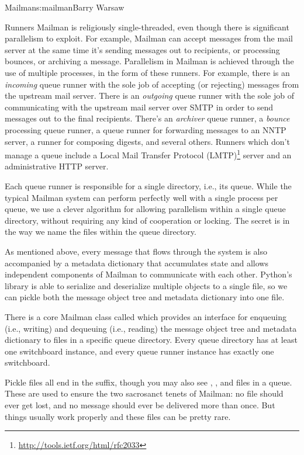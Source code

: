 \begin{aosachapter}{Mailman}{s:mailman}{Barry Warsaw}
\begin{aosasect1}{Runners}
Mailman is religiously single-threaded, even though there is
significant parallelism to exploit.  For example, Mailman can accept
messages from the mail server at the same time it's sending messages
out to recipients, or processing bounces, or archiving a message.
Parallelism in Mailman is achieved through the use of multiple
processes, in the form of these runners.  For example, there is an
\emph{incoming} queue runner with the sole job of accepting (or
rejecting) messages from the upstream mail server.  There is an
\emph{outgoing} queue runner with the sole job of communicating with
the upstream mail server over SMTP in order to send messages out to
the final recipients.  There's an \emph{archiver} queue runner, a
\emph{bounce} processing queue runner, a queue runner for forwarding
messages to an NNTP server, a runner for composing digests, and
several others.  Runners which don't manage a queue include a Local
Mail Transfer Protocol
(LMTP)\footnote{\url{http://tools.ietf.org/html/rfc2033}} server and
an administrative HTTP server.

Each queue runner is responsible for a single directory, i.e., its
queue.  While the typical Mailman system can perform perfectly
well with a single process per queue, we use a clever algorithm for
allowing parallelism within a single queue directory, without
requiring any kind of cooperation or locking.  The secret is in the
way we name the files within the queue directory.

As mentioned above, every message that flows through the system is
also accompanied by a metadata dictionary that accumulates state and
allows independent components of Mailman to communicate with each
other.  Python's  library is able to serialize and
deserialize multiple objects to a single file, so we can pickle both
the message object tree and metadata dictionary into one file.

There is a core Mailman class called  which provides
an interface for enqueuing (i.e., writing) and dequeuing (i.e.,
reading) the message object tree and metadata dictionary to files in a
specific queue directory.  Every queue directory has at least one
switchboard instance, and every queue runner instance has exactly one
switchboard.

Pickle files all end in the  suffix, though you may also
see , , and  files in a queue.  These
are used to ensure the two sacrosanct tenets of Mailman: no file
should ever get lost, and no message should ever be delivered more
than once.  But things usually work properly and these files can be
pretty rare.


\end{aosasect1}
\end{aosachapter}
